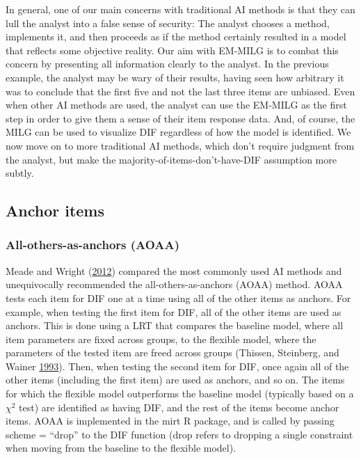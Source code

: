 \documentclass[
  11pt,
]{article}
\begin{document}
In general, one of our main concerns with traditional AI methods is that they can lull the analyst into a false sense of security: The analyst chooses a method, implements it, and then proceeds as if the method certainly resulted in a model that reflects some objective reality. Our aim with EM-MILG is to combat this concern by presenting all information clearly to the analyst. In the previous example, the analyst may be wary of their results, having seen how arbitrary it was to conclude that the first five and not the last three items are unbiased. Even when other AI methods are used, the analyst can use the EM-MILG as the first step in order to give them a sense of their item response data. And, of course, the MILG can be used to visualize DIF regardless of how the model is identified. We now move on to more traditional AI methods, which don't require judgment from the analyst, but make the majority-of-items-don't-have-DIF assumption more subtly.

\hypertarget{anchoritems}{%
\subsection{Anchor items}\label{anchoritems}}

\hypertarget{all-others-as-anchors-aoaa}{%
\subsubsection{All-others-as-anchors (AOAA)}\label{all-others-as-anchors-aoaa}}

Meade and Wright (\protect\hyperlink{ref-meade2012solving}{2012}) compared the most commonly used AI methods and unequivocally recommended the all-others-as-anchors (AOAA) method. AOAA tests each item for DIF one at a time using all of the other items as anchors. For example, when testing the first item for DIF, all of the other items are used as anchors. This is done using a LRT that compares the baseline model, where all item parameters are fixed across groups, to the flexible model, where the parameters of the tested item are freed across groups (Thissen, Steinberg, and Wainer \protect\hyperlink{ref-thissen1993detection}{1993}). Then, when testing the second item for DIF, once again all of the other items (including the first item) are used as anchors, and so on. The items for which the flexible model outperforms the baseline model (typically based on a \(\chi^2\) test) are identified as having DIF, and the rest of the items become anchor items. AOAA is implemented in the mirt R package, and is called by passing scheme = \enquote{drop} to the DIF function (drop refers to dropping a single constraint when moving from the baseline to the flexible model).
\end{document}
